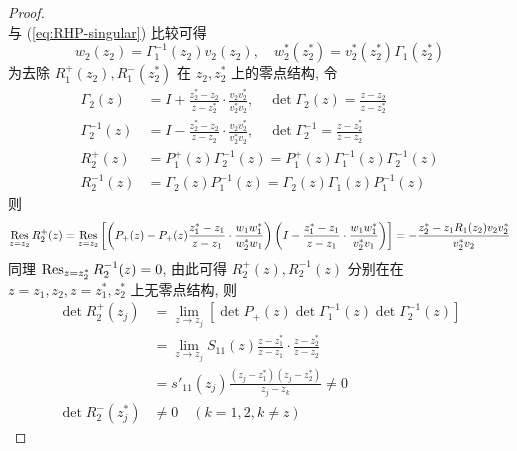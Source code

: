 \begin{proof}
\begin{equation}
  \end{equation}
  与 (\ref{eq:RHP-singular}) 比较可得
  \begin{equation}
    w_{2}(z_{2}) = \Gamma_{1}^{-1}(z_{2}) v_{2}(z_{2}), \quad w_{2}^{*}(z_{2}^{*}) = v_{2}^{*}(z_{2}^{*}) \Gamma_{1}(z_{2}^{*})
  \end{equation}
  为去除 $ R_{1}^{+}(z_{2}), R_{1}^{-}(z_{2}^{*}) $ 在 $ z_{2}, z_{2}^{*} $ 上的零点结构, 令
  \begin{equation}
    \begin{aligned}
    \Gamma_{2}(z) &= I + \frac{z_{2}^{*} - z_{2}}{z - z_{2}^{*}}\cdot \frac{v_{2}v_{2}^{*}}{v_{2}^{*}v_{2}}, \quad \det \Gamma_{2}(z) = \frac{z - z_{2}}{z - z_{2}^{*}} \\
    \Gamma_{2}^{-1}(z) &= I - \frac{z_{2}^{*} - z_{2}}{z - z_{2}} \cdot \frac{v_{2}v_{2}^{*}}{v_{2}^{*}v_{2}}, \quad  \det \Gamma_{2}^{-1} = \frac{z - z_{2}^{*}}{z - z_{2}}\\
    R_{2}^{+}(z) &= P_{1}^{+}(z) \Gamma_{2}^{-1}(z) = P_{1}^{+}(z) \Gamma_{1}^{-1}(z) \Gamma_{2}^{-1}(z) \\
    R_{2}^{-1}(z) &= \Gamma_{2}(z) P_{1}^{-1}(z) = \Gamma_{2}(z) \Gamma_{1}(z) P_{1}^{-1}(z)
  \end{aligned}
  \end{equation}
  则
  \begin{equation}
    \operatorname*{Res}_{z = z_{2}} R_{2}^{+}(z) = \operatorname*{Res}_{z = z_{2}} \left[ \left(P_{+}(z) - P_{+}(z) \frac{z_{1}^{*} - z_{1}}{z - z_{1}} \cdot \frac{w_{1}w_{1}^{*}}{w_{2}^{*}w_{1}}\right) \left( I -\frac{z_{1}^{*} - z_{1}}{z - z_{1}} \cdot \frac{w_{1}w_{1}^{*}}{v_{2}^{*}v_{1}} \right)\right] = - \frac{z_{2}^{*} - z_{1}R_{1}(z_{2})v_{2}v_{2}^{*}}{v_{2}^{*}v_{2}}
  \end{equation}
  同理 $ \operatorname*{Res}_{z = z_{2}^{*}} R_{2}^{-1}(z) = 0 $, 由此可得 $ R_{2}^{+}(z), R_{2}^{-1}(z) $ 分别在在 $ z=z_{1}, z_{2}, z=z_{1}^{*}, z_{2}^{*} $ 上无零点结构, 则
  \begin{equation}
    \begin{aligned}
    \det R_{2}^{+}(z_{j}) &= \lim_{z \to z_{j}} \left[ \det P_{+}(z) \det \Gamma_{1}^{-1}(z) \det \Gamma_{2}^{-1}(z)\right] \\
    &= \lim_{z \to z_{j}} S_{11}(z) \frac{z - z_{1}^{*}}{z - z_{1}} \cdot \frac{z - z_{2}^{*}}{z - z_{2}} \\
    &= s'_{11}(z_{j}) \frac{(z_{j} - z_{1}^{*})(z_{j} - z_{2}^{*})}{z_{j} - z_{k}} \neq 0 \\
    \det R_{2}^{-}(z_{j}^{*}) &\neq 0 \quad (k = 1, 2, k \neq z)
    \end{aligned}

\end{equation}
\end{proof}
